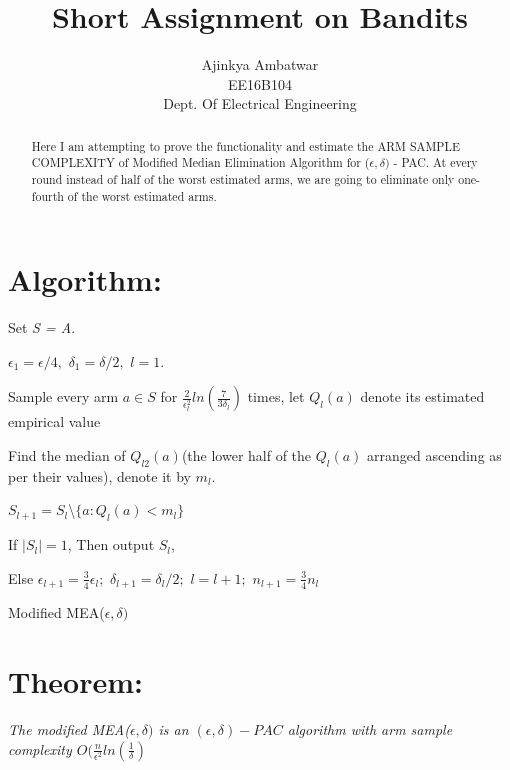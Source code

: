 \documentclass[english]{article}
\begin{document}
\title{Short Assignment on Bandits}

\author{Ajinkya Ambatwar\\
EE16B104\\
Dept. Of Electrical Engineering}
\maketitle
\begin{abstract}
Here I am attempting to prove the functionality and estimate the ARM
SAMPLE COMPLEXITY of Modified Median Elimination Algorithm for ($\epsilon,\delta)$
- PAC. At every round instead of half of the worst estimated arms,
we are going to eliminate only one-fourth of the worst estimated arms.
\end{abstract}

\section*{Algorithm:}

\begin{algorithm}[H]
\begin{algorithmic}[1]

\STATE Set \textit{S = A}.

\STATE $\epsilon_{1}=\epsilon/4,$ $\delta_{1}=\delta/2,$ $l=1$.

\STATE Sample every arm $a\in S$ for $\frac{2}{\epsilon_{l}^{2}}ln(\frac{7}{3\delta_{l}})$
times, let $Q_{l}(a)$ denote its estimated empirical value

\STATE Find the median of $Q_{l2}(a)$(the lower half of the $Q_{l}(a)$
arranged ascending as per their values), denote it by $m_{l}$.

\STATE $S_{l+1}=S_{l}$\textbackslash{}$\{a:Q_{l}(a)<m_{l}\}$

\STATE If $|S_{l}|=1$, Then output $S_{l}$,

Else $\epsilon_{l+1}=\frac{3}{4}\epsilon_{l};$ $\delta_{l+1}=\delta_{l}/2;$
$l=l+1;$ $n_{l+1}=\frac{3}{4}n_{l}$

\end{algorithmic}

\caption{Modified MEA($\epsilon,\delta)$}
\end{algorithm}

\section*{Theorem:}

\textit{The modified MEA($\epsilon,\delta)$ is an $(\epsilon,\delta)-PAC$
algorithm with arm sample complexity $O(\frac{n}{\epsilon^{2}}ln(\frac{1}{\delta})$}
\end{document}

